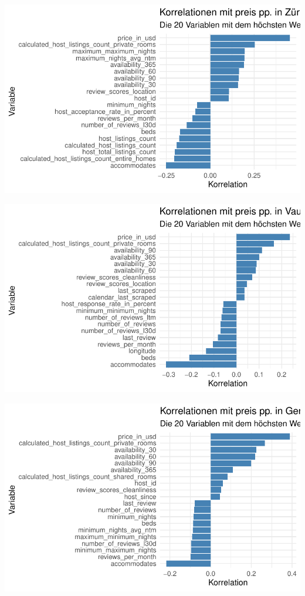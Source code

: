 \documentclass[
  journal,
]{IEEEtran}%
\begin{document}
\includegraphics{main_files/figure-pdf/unnamed-chunk-12-1.pdf}

\includegraphics{main_files/figure-pdf/unnamed-chunk-12-2.pdf}

\includegraphics{main_files/figure-pdf/unnamed-chunk-12-3.pdf}
\end{document}
